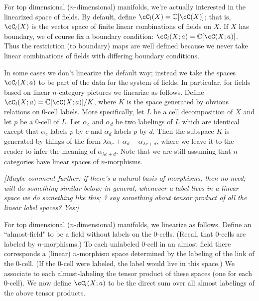 \documentclass[11pt,leqno]{amsart}
\def\c{\mathbb{C}}
\def\nn#1{{{\it \small [#1]}}}
\begin{document}

\medskip

For top dimensional ($n$-dimensional) manifolds, we're actually interested
in the linearized space of fields.
By default, define $\cC_l(X) = \c[\cC(X)]$; that is, $\cC_l(X)$ is
the vector space of finite
linear combinations of fields on $X$.
If $X$ has boundary, we of course fix a boundary condition: $\cC_l(X; a) = \c[\cC(X; a)]$.
Thus the restriction (to boundary) maps are well defined because we never
take linear combinations of fields with differing boundary conditions.

In some cases we don't linearize the default way; instead we take the
spaces $\cC_l(X; a)$ to be part of the data for the system of fields.
In particular, for fields based on linear $n$-category pictures we linearize as follows.
Define $\cC_l(X; a) = \c[\cC(X; a)]/K$, where $K$ is the space generated by
obvious relations on 0-cell labels.
More specifically, let $L$ be a cell decomposition of $X$
and let $p$ be a 0-cell of $L$.
Let $\alpha_c$ and $\alpha_d$ be two labelings of $L$ which are identical except that
$\alpha_c$ labels $p$ by $c$ and $\alpha_d$ labels $p$ by $d$.
Then the subspace $K$ is generated by things of the form
$\lambda \alpha_c + \alpha_d - \alpha_{\lambda c + d}$, where we leave it to the reader
to infer the meaning of $\alpha_{\lambda c + d}$.
Note that we are still assuming that $n$-categories have linear spaces of $n$-morphisms.

\nn{Maybe comment further: if there's a natural basis of morphisms, then no need;
will do something similar below; in general, whenever a label lives in a linear
space we do something like this; ? say something about tensor
product of all the linear label spaces?  Yes:}

For top dimensional ($n$-dimensional) manifolds, we linearize as follows.
Define an ``almost-field" to be a field without labels on the 0-cells.
(Recall that 0-cells are labeled by $n$-morphisms.)
To each unlabeled 0-cell in an almost field there corresponds a (linear) $n$-morphism
space determined by the labeling of the link of the 0-cell.
(If the 0-cell were labeled, the label would live in this space.)
We associate to each almost-labeling the tensor product of these spaces (one for each 0-cell).
We now define $\cC_l(X; a)$ to be the direct sum over all almost labelings of the
above tensor products.
\end{document}
